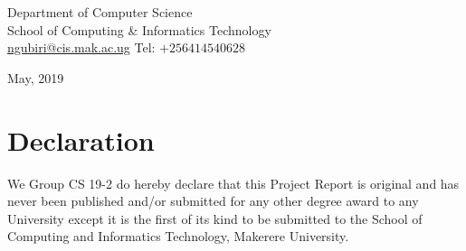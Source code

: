 \documentclass[12pt, a4paper]{report}
\begin{document}
\begin{center}
\vspace{1em}

Department of Computer Science\\

School of Computing \& Informatics Technology \\


\url{ngubiri@cis.mak.ac.ug} Tel: $+256414540628$

\vfill


May, 2019

\end{center}


\chapter*{Declaration}

We Group CS 19-2 do hereby declare that this Project Report is original and has never been published and/or submitted for any other degree award to any University except it is the first of its kind to be submitted to the School of Computing and Informatics Technology, Makerere University.



\begin{table}[!ht]

\centering


\end{table}
\end{document}
